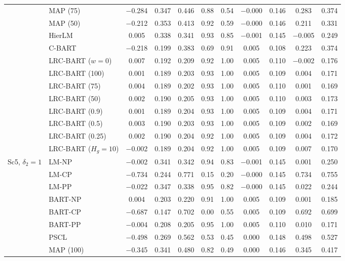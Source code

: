 \documentclass[11pt]{article}
\theoremstyle{definition}
\theoremstyle{plain}
\begin{document}
\begin{center}
\begin{longtable}{llccccccccc}
& MAP (75) & $-$0.284 & 0.347 & 0.446 & 0.88 & 0.54 & $-$0.000 & 0.146 & 0.283 & 0.374 \\
& MAP (50) & $-$0.212 & 0.353 & 0.413 & 0.92 & 0.59 & $-$0.000 & 0.146 & 0.211 & 0.331 \\
& HierLM & 0.005 & 0.338 & 0.341 & 0.93 & 0.85 & $-$0.001 & 0.145 & $-$0.005 & 0.249 \\
& C-BART & $-$0.218 & 0.199 & 0.383 & 0.69 & 0.91 & 0.005 & 0.108 & 0.223 & 0.374 \\
& LRC-BART ($w=0$) & 0.007 & 0.192 & 0.209 & 0.92 & 1.00 & 0.005 & 0.110 & $-$0.002 & 0.176 \\
& LRC-BART (100) & 0.001 & 0.189 & 0.203 & 0.93 & 1.00 & 0.005 & 0.109 & 0.004 & 0.171 \\
& LRC-BART (75) & 0.004 & 0.189 & 0.202 & 0.93 & 1.00 & 0.005 & 0.110 & 0.001 & 0.169 \\
& LRC-BART (50) & 0.002 & 0.190 & 0.205 & 0.93 & 1.00 & 0.005 & 0.110 & 0.003 & 0.173 \\
& LRC-BART (0.9) & 0.001 & 0.189 & 0.204 & 0.93 & 1.00 & 0.005 & 0.109 & 0.004 & 0.171 \\
& LRC-BART (0.5) & 0.003 & 0.190 & 0.203 & 0.93 & 1.00 & 0.005 & 0.109 & 0.002 & 0.169 \\
& LRC-BART (0.25) & 0.002 & 0.190 & 0.204 & 0.92 & 1.00 & 0.005 & 0.109 & 0.004 & 0.172 \\
& LRC-BART ($H_g=10$) & $-$0.002 & 0.189 & 0.204 & 0.92 & 1.00 & 0.005 & 0.109 & 0.007 & 0.170 \\
\midrule
\multirow{20}{*}{Sc5, $\delta_2=1$} & LM-NP & $-$0.002 & 0.341 & 0.342 & 0.94 & 0.83 & $-$0.001 & 0.145 & 0.001 & 0.250 \\
& LM-CP & $-$0.734 & 0.244 & 0.771 & 0.15 & 0.20 & $-$0.000 & 0.145 & 0.734 & 0.755 \\
& LM-PP & $-$0.022 & 0.347 & 0.338 & 0.95 & 0.82 & $-$0.000 & 0.145 & 0.022 & 0.244 \\
& BART-NP & 0.004 & 0.203 & 0.220 & 0.91 & 1.00 & 0.005 & 0.109 & 0.001 & 0.185 \\
& BART-CP & $-$0.687 & 0.147 & 0.702 & 0.00 & 0.55 & 0.005 & 0.109 & 0.692 & 0.699 \\
& BART-PP & $-$0.004 & 0.208 & 0.205 & 0.95 & 1.00 & 0.005 & 0.110 & 0.010 & 0.171 \\
& PSCL & $-$0.498 & 0.269 & 0.562 & 0.53 & 0.45 & 0.000 & 0.148 & 0.498 & 0.527 \\
& MAP (100) & $-$0.345 & 0.341 & 0.480 & 0.82 & 0.49 & 0.000 & 0.146 & 0.345 & 0.417 \\

\end{longtable}
\end{center}
\end{document}
